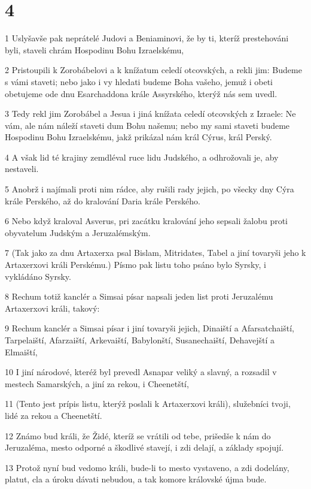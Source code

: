 \chapter{4}

\par 1 Uslyšavše pak neprátelé Judovi a Beniaminovi, že by ti, kteríž prestehováni byli, staveli chrám Hospodinu Bohu Izraelskému,
\par 2 Pristoupili k Zorobábelovi a k knížatum celedí otcovských, a rekli jim: Budeme s vámi staveti; nebo jako i vy hledati budeme Boha vašeho, jemuž i obeti obetujeme ode dnu Esarchaddona krále Assyrského, kterýž nás sem uvedl.
\par 3 Tedy rekl jim Zorobábel a Jesua i jiná knížata celedí otcovských z Izraele: Ne vám, ale nám náleží staveti dum Bohu našemu; nebo my sami staveti budeme Hospodinu Bohu Izraelskému, jakž prikázal nám král Cýrus, král Perský.
\par 4 A však lid té krajiny zemdléval ruce lidu Judského, a odhrožovali je, aby nestaveli.
\par 5 Anobrž i najímali proti nim rádce, aby rušili rady jejich, po všecky dny Cýra krále Perského, až do kralování Daria krále Perského.
\par 6 Nebo když kraloval Asverus, pri zacátku kralování jeho sepsali žalobu proti obyvatelum Judským a Jeruzalémským.
\par 7 (Tak jako za dnu Artaxerxa psal Bislam, Mitridates, Tabel a jiní tovaryši jeho k Artaxerxovi králi Perskému.) Písmo pak listu toho psáno bylo Syrsky, i vykládáno Syrsky.
\par 8 Rechum totiž kanclér a Simsai písar napsali jeden list proti Jeruzalému Artaxerxovi králi, takový:
\par 9 Rechum kanclér a Simsai písar i jiní tovaryši jejich, Dinaiští a Afarsatchaiští, Tarpelaiští, Afarzaiští, Arkevaiští, Babylonští, Susanechaiští, Dehavejští a Elmaiští,
\par 10 I jiní národové, kteréž byl prevedl Asnapar veliký a slavný, a rozsadil v mestech Samarských, a jiní za rekou, i Cheenetští,
\par 11 (Tento jest prípis listu, kterýž poslali k Artaxerxovi králi), služebníci tvoji, lidé za rekou a Cheenetští.
\par 12 Známo bud králi, že Židé, kteríž se vrátili od tebe, prišedše k nám do Jeruzaléma, mesto odporné a škodlivé stavejí, i zdi delají, a základy spojují.
\par 13 Protož nyní bud vedomo králi, bude-li to mesto vystaveno, a zdi dodelány, platut, cla a úroku dávati nebudou, a tak komore královské újma bude.
